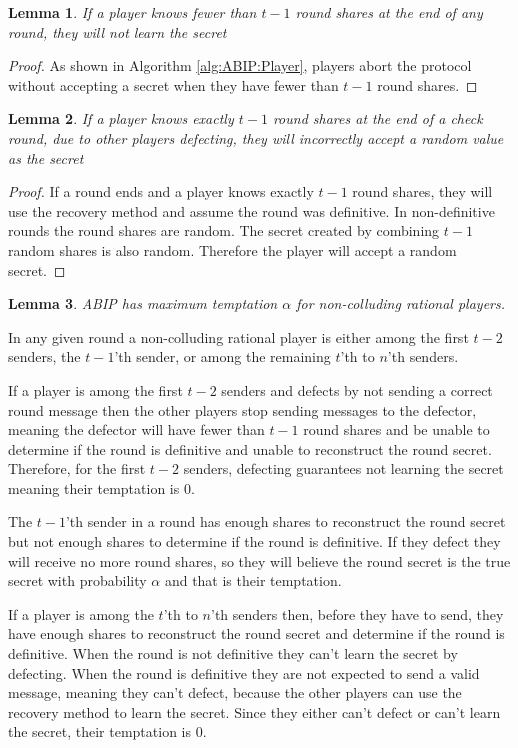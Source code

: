 \documentclass{dalcsthesis}
\newtheorem{lemma}{Lemma}
\begin{document}
\begin{lemma} If a player knows fewer than $t-1$ round shares at the end of any round, they will not learn the secret \label{Lem:ABIP:FewSharesNolearn} \end{lemma}
\begin{proof}
As shown in Algorithm \ref{alg:ABIP:Player}, players abort the protocol without accepting a secret when they have fewer than $t-1$ round shares. 
\end{proof}

\begin{lemma} If a player knows exactly $t-1$ round shares at the end of a check round, due to other players defecting, they will incorrectly accept a random value as the secret \label{Lem:ABIP:MissDefSharesLearnWrong} \end{lemma}
\begin{proof}
If a round ends and a player knows exactly $t-1$ round shares, they will use the recovery method and assume the round was definitive. In non-definitive rounds the round shares are random. The secret created by combining $t-1$ random shares is also random. Therefore the player will accept a random secret.
\end{proof}

\begin{lemma} ABIP has maximum temptation $\alpha$ for non-colluding rational players. \label{Lem:ABIP:SoloTemptation} \end{lemma}

In any given round a non-colluding rational player is either among the first $t-2$ senders, the $t-1$'th sender, or among the remaining $t$'th to $n$'th senders.

If a player is among the first $t-2$ senders and defects by not sending a correct round message then the other players stop sending messages to the defector, meaning the defector will have fewer than $t-1$ round shares and be unable to determine if the round is definitive and unable to reconstruct the round secret. Therefore, for the first $t-2$ senders, defecting guarantees not learning the secret meaning their temptation is $0$.

The $t-1$'th sender in a round has enough shares to reconstruct the round secret but not enough shares to determine if the round is definitive. If they defect they will receive no more round shares, so they will believe the round secret is the true secret with probability $\alpha$ and that is their temptation.

If a player is among the $t$'th to $n$'th senders then, before they have to send, they have enough shares to reconstruct the round secret and determine if the round is definitive. When the round is not definitive they can't learn the secret by defecting. When the round is definitive they are not expected to send a valid message, meaning they can't defect, because the other players can use the recovery method to learn the secret. Since they either can't defect or can't learn the secret, their temptation is $0$.
\end{document}
